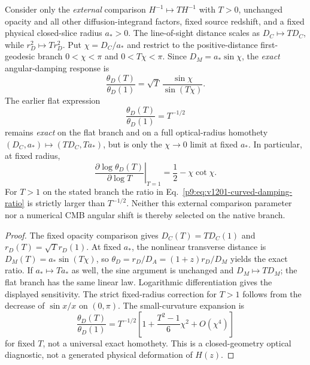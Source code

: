 \documentclass[12pt,a4paper]{article}
\begin{document}
\begin{proposition}
\label{p9:prop:external-optical-homothety-diagnostic}
Consider only the \emph{external} comparison \(H^{-1}\mapsto T H^{-1}\)
with \(T>0\), unchanged opacity and all other diffusion-integrand factors,
fixed source redshift, and a fixed physical closed-slice radius \(a_*>0\).
The line-of-sight distance scales as \(D_C\mapsto TD_C\), while
\(r_D^2\mapsto Tr_D^2\).  Put \(\chi=D_C/a_*\) and restrict to the
positive-distance first-geodesic branch \(0<\chi<\pi\) and
\(0<T\chi<\pi\).  Since \(D_M=a_*\sin\chi\), the \emph{exact}
angular-damping response is
\begin{equation}
\label{p9:eq:v1201-curved-damping-ratio}
 \boxed{\frac{\theta_D(T)}{\theta_D(1)}
 =\sqrt T\,\frac{\sin\chi}{\sin(T\chi)}.}
\end{equation}
The earlier flat expression
\begin{equation}
\label{p9:eq:damping-residual}
 \frac{\theta_D(T)}{\theta_D(1)}=T^{-1/2}
\end{equation}
remains \emph{exact} on the flat branch and on a full optical-radius
homothety \((D_C,a_*)\mapsto(TD_C,Ta_*)\), but is only the
\(\chi\to0\) limit at fixed \(a_*\).
In particular, at fixed radius,
\begin{equation}
\label{p9:eq:v1201-curved-damping-sensitivity}
 \left.\frac{\partial\log\theta_D(T)}{\partial\log T}
 \right|_{T=1}=\frac12-\chi\cot\chi.
\end{equation}
For \(T>1\) on the stated branch the ratio in
Eq.~\eqref{p9:eq:v1201-curved-damping-ratio} is strictly larger than
\(T^{-1/2}\).  Neither this external comparison parameter nor a numerical
CMB angular shift is thereby selected on the native branch.
\end{proposition}

\begin{proof}
The fixed opacity comparison gives \(D_C(T)=TD_C(1)\) and
\(r_D(T)=\sqrt T r_D(1)\).  At fixed \(a_*\), the nonlinear transverse
distance is \(D_M(T)=a_*\sin(T\chi)\), so
\(\theta_D=r_D/D_A=(1+z)r_D/D_M\) yields the exact ratio.
If \(a_*\mapsto Ta_*\) as well, the sine argument is unchanged and
\(D_M\mapsto TD_M\); the flat branch has the same linear law.
Logarithmic differentiation gives the displayed sensitivity.  The strict
fixed-radius correction for \(T>1\) follows from the decrease of
\(\sin x/x\) on \((0,\pi)\).  The small-curvature expansion is
\[
 \frac{\theta_D(T)}{\theta_D(1)}
 =T^{-1/2}\left[1+\frac{T^2-1}{6}\chi^2+O(\chi^4)\right]
\]
for fixed \(T\), not a universal exact homothety.  This is a closed-geometry
optical diagnostic, not a generated physical deformation of \(H(z)\).
\end{proof}
\end{document}
